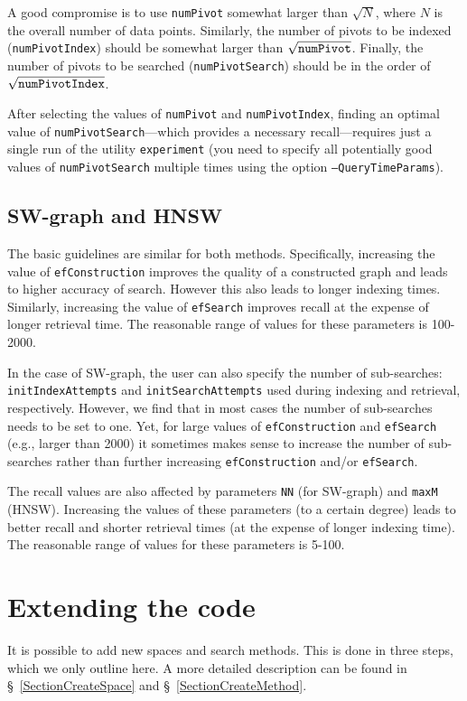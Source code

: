 \documentclass[runningheads,a4paper]{llncs}
\newcommand{\ttt}[1]{\texttt{#1}}
\begin{document}
A good compromise is to use \ttt{numPivot} somewhat larger than $\sqrt N$, where $N$ is the overall
number of data points. Similarly, the number of pivots to be indexed (\ttt{numPivotIndex})
should be somewhat larger than $\sqrt{\mbox{\ttt{numPivot}}}$. Finally, the number of pivots
to be searched (\ttt{numPivotSearch}) should be in the order of $\sqrt{\mbox{\ttt{numPivotIndex}}}$.

After selecting the values of \ttt{numPivot} and \ttt{numPivotIndex}, finding an optimal value of
\ttt{numPivotSearch}---which provides a necessary recall---requires just a single run of the utility \ttt{experiment}
(you need to specify all potentially good values of \ttt{numPivotSearch} multiple times using the option
\ttt{--QueryTimeParams}). 


\subsection{SW-graph and HNSW}
The basic guidelines are similar for both methods.
Specifically, increasing the value of \ttt{efConstruction} improves the quality of a constructed graph and
leads to higher accuracy of search.
However this also leads to longer indexing times.
Similarly, increasing the value of \ttt{efSearch} improves recall at the expense of longer retrieval time. 
The reasonable range of values for these parameters is 100-2000.

In the case of SW-graph, the user can also specify the number of sub-searches: \ttt{initIndexAttempts} and
\ttt{initSearchAttempts} used during indexing and retrieval, respectively. 
However, we find that in most cases the number of sub-searches needs to be set to one.
Yet, for large values of \ttt{efConstruction} and \ttt{efSearch} (e.g., larger than 2000)
it sometimes makes sense to increase the number of sub-searches rather than further increasing
\ttt{efConstruction} and/or \ttt{efSearch}.

The recall values are also affected by parameters \ttt{NN} (for SW-graph) and \ttt{maxM} (HNSW).
Increasing the values of these parameters (to a certain degree) leads to better recall and shorter retrieval times
(at the expense of longer indexing time).  The reasonable range of values for these parameters is 5-100.

\section{Extending the code}\label{SectionExtend}
It is possible to add new spaces and search methods.
This is done in three steps, which we only outline here.
A more detailed description can be found in \S~\ref{SectionCreateSpace}
and \S~\ref{SectionCreateMethod}.
\end{document}
